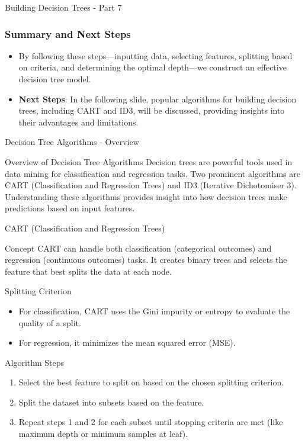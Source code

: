 \documentclass[aspectratio=169]{beamer}
\begin{document}
\begin{frame}[fragile]{Building Decision Trees - Part 7}
    \frametitle{Summary and Next Steps}
    \begin{itemize}
        \item By following these steps—inputting data, selecting features, splitting based on criteria, and determining the optimal depth—we construct an effective decision tree model.
        \item \textbf{Next Steps}: In the following slide, popular algorithms for building decision trees, including CART and ID3, will be discussed, providing insights into their advantages and limitations.
    \end{itemize}
\end{frame}

\begin{frame}[fragile]{Decision Tree Algorithms - Overview}
    \begin{block}{Overview of Decision Tree Algorithms}
        Decision trees are powerful tools used in data mining for classification and regression tasks. 
        Two prominent algorithms are CART (Classification and Regression Trees) and ID3 (Iterative Dichotomiser 3). 
        Understanding these algorithms provides insight into how decision trees make predictions based on input features.
    \end{block}
\end{frame}

\begin{frame}[fragile]{CART (Classification and Regression Trees)}
    \begin{block}{Concept}
        CART can handle both classification (categorical outcomes) and regression (continuous outcomes) tasks. 
        It creates binary trees and selects the feature that best splits the data at each node.
    \end{block}

    \begin{block}{Splitting Criterion}
        \begin{itemize}
            \item For classification, CART uses the Gini impurity or entropy to evaluate the quality of a split.
            \item For regression, it minimizes the mean squared error (MSE).
        \end{itemize}
    \end{block}

    \begin{block}{Algorithm Steps}
        \begin{enumerate}
            \item Select the best feature to split on based on the chosen splitting criterion.
            \item Split the dataset into subsets based on the feature.
            \item Repeat steps 1 and 2 for each subset until stopping criteria are met (like maximum depth or minimum samples at leaf).
        \end{enumerate}
    \end{block}
\end{frame}
\end{document}
